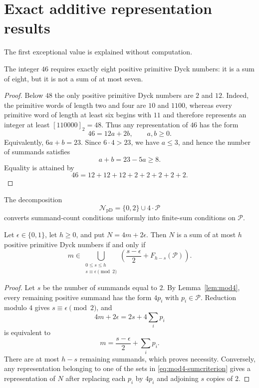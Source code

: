 \documentclass{ws-ijfcs}
\newcommand{\NpD}{\mathcal{N}_{\mathrm{pD}}}
\newcommand{\Pset}{\mathcal P}
\begin{document}
\section{Exact additive representation results}\label{sec:exceptions}

The first exceptional value is explained without computation.

\begin{proposition}\label{prop:46}
The integer $46$ requires exactly eight positive primitive Dyck numbers:
it is a sum of eight, but it is not a sum of at most seven.
\end{proposition}

\begin{proof}
Below $48$ the only positive primitive Dyck numbers are $2$ and $12$.
Indeed, the primitive words of length two and four are $10$ and $1100$,
whereas every primitive word of length at least six begins with $11$ and
therefore represents an integer at least $[110000]_2=48$.  Thus any
representation of $46$ has the form
\[
        46=12a+2b,\qquad a,b\geq0.
\]
Equivalently, $6a+b=23$.  Since $6\cdot4>23$, we have $a\leq3$, and
hence the number of summands satisfies
\[
        a+b=23-5a\geq8.
\]
Equality is attained by
\[
        46=12+12+12+2+2+2+2+2.
\]
\end{proof}


The decomposition
\[
 \NpD=\{0,2\}\cup4\cdot\Pset
\]
converts summand-count conditions uniformly into finite-sum conditions on
$\Pset$.

\begin{lemma}\label{lem:mod4-sumcriterion}
Let $\epsilon\in\{0,1\}$, let $h\geq0$, and put
$N=4m+2\epsilon$.  Then $N$ is a sum of at most $h$ positive primitive
Dyck numbers if and only if
\begin{equation}\label{eq:mod4-sumcriterion}
 m\in
 \bigcup_{\substack{0\leq s\leq h\\
                    s\equiv\epsilon\pmod2}}
 \left(
  \frac{s-\epsilon}{2}+F_{h-s}(\Pset)
 \right).
\end{equation}
\end{lemma}

\begin{proof}
Let $s$ be the number of summands equal to $2$.  By
Lemma~\ref{lem:mod4}, every remaining positive summand has the form
$4p_i$ with $p_i\in\Pset$.  Reduction modulo $4$ gives
$s\equiv\epsilon\pmod2$, and
\[
 4m+2\epsilon=2s+4\sum_i p_i
\]
is equivalent to
\[
 m=\frac{s-\epsilon}{2}+\sum_i p_i.
\]
There are at most $h-s$ remaining summands, which proves necessity.
Conversely, any representation belonging to one of the sets in
\eqref{eq:mod4-sumcriterion} gives a representation of $N$ after
replacing each $p_i$ by $4p_i$ and adjoining $s$ copies of $2$.
\end{proof}
\end{document}
